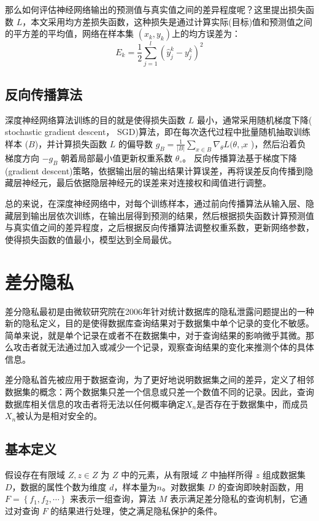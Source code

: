 那么如何评估神经网络输出的预测值与真实值之间的差异程度呢？这里提出损失函数 $L$，本文采用均方差损失函数，这种损失是通过计算实际(目标)值和预测值之间的平方差的平均值，网络在样本集 $\left(x_{k}, y_{k}\right)$上的均方误差为：
\begin{equation}\label{神经网络损失函数}
E_{k}=\frac{1}{2} \sum_{j=1}^{l}\left(\hat{y}_{j}^{k}-y_{j}^{k}\right)^{2}
\end{equation}

\subsection{反向传播算法}
深度神经网络算法训练的目的就是使得损失函数 $L$ 最小，通常采用随机梯度下降( stochastic gradient descent， SGD)算法，即在每次迭代过程中批量随机抽取训练样本 ($B$)，并计算损失函数 $L$ 的偏导数 $g_{B}=\frac{1}{|B|} \sum_{x \in B} \nabla_{\theta} L(\theta,$,$x$ )，然后沿着负梯度方向 $-g_{B}$ 朝着局部最小值更新权重系数 $\theta_{\circ}$。
反向传播算法基于梯度下降(gradient descent)策略，依据输出层的输出结果计算误差，再将误差反向传播到隐藏层神经元，最后依据隐层神经元的误差来对连接权和阈值进行调整。

总的来说，在深度神经网络中，对每个训练样本，通过前向传播算法从输入层、隐藏层到输出层依次训练，在输出层得到预测的结果，然后根据损失函数计算预测值与真实值之间的差异程度，之后根据反向传播算法调整权重系数，更新网络参数，使得损失函数的值最小，模型达到全局最优。

\section{差分隐私}
差分隐私最初是由微软研究院在2006年针对统计数据库的隐私泄露问题提出的一种新的隐私定义，目的是使得数据库查询结果对于数据集中单个记录的变化不敏感。简单来说，就是单个记录在或者不在数据集中，对于查询结果的影响微乎其微。那么攻击者就无法通过加入或减少一个记录，观察查询结果的变化来推测个体的具体信息。

差分隐私首先被应用于数据查询，为了更好地说明数据集之间的差异，定义了相邻数据集的概念：两个数据集只差一个信息或只差一个数值不同的记录。因此，查询数据库相关信息的攻击者将无法以任何概率确定$X_{n}$是否存在于数据集中，而成员$X_{n}$被认为是相对安全的。

\subsection{基本定义}
假设存在有限域 $Z,z \in Z$ 为 $Z$ 中的元素，从有限域 $Z$ 中抽样所得 $z$ 组成数据集 $D$，数据的属性个数为维度 $d$，样本量为$n$。对数据集 $D$ 的查询即映射函数，用 $F=\left\{f_{1}, f_{2}, \cdots\right\}$ 来表示一组查询，算法 $M$ 表示满足差分隐私的查询机制，它通过对查询 $F$ 的结果进行处理，使之满足隐私保护的条件。

